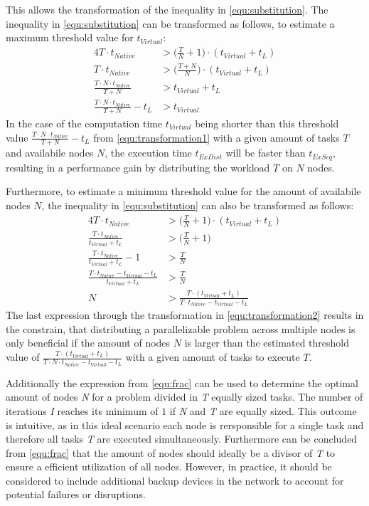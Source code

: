 This allows the transformation of the inequality in \eqref{equ:substitution}. The inequality in \eqref{equ:substitution} can be transformed as follows, to estimate a maximum threshold value for $t_{Virtual}$:
\begin{alignat}{4}
  T \cdot t_{Native} &> \bigg(\frac{T}{N} + 1\bigg) \cdot (t_{Virtual} + t_{L}) \nonumber \\
  T \cdot t_{Native} &> \bigg(\frac{T + N}{N}\bigg) \cdot (t_{Virtual} + t_{L}) \nonumber \\
  \frac{T \cdot N \cdot t_{Native}}{T + N} &> t_{Virtual} + t_{L} \nonumber \\
  \frac{T \cdot N \cdot t_{Native}}{T + N} - t_{L} &> t_{Virtual}
  \label{equ:transformation1}
\end{alignat}
In the case of the computation time $t_{Virtual}$ being shorter than this threshold value $\frac{T \cdot N \cdot t_{Native}}{T + N} - t_{L}$ from \eqref{equ:transformation1} with a given amount of tasks $T$ and availabile nodes $N$, the execution time $t_{ExDist}$ will be faster than $t_{ExSeq}$, resulting in a performance gain by distributing the workload $T$ on $N$ nodes.

Furthermore, to estimate a minimum threshold value for the amount of availabile nodes $N$, the inequality in \eqref{equ:substitution} can also be transformed as follows:
\begin{alignat}{4}
  T \cdot t_{Native} &> \bigg(\frac{T}{N} + 1\bigg) \cdot (t_{Virtual} + t_{L}) \nonumber \\
  \frac{T \cdot t_{Native}}{t_{Virtual} + t_{L}} &> \bigg(\frac{T}{N} + 1\bigg) \nonumber \\
  \frac{T \cdot t_{Native}}{t_{Virtual} + t_{L}} - 1 &> \frac{T}{N} \nonumber \\
  \frac{T \cdot t_{Native} - t_{Virtual} - t_{L}}{t_{Virtual} + t_{L}} &> \frac{T}{N} \nonumber \\
  N &> \frac{T \cdot (t_{Virtual} + t_{L})}{T \cdot t_{Native} - t_{Virtual} - t_{L}}
  \label{equ:transformation2}
\end{alignat}
The last expression through the transformation in \eqref{equ:transformation2} results in the constrain, that distributing a parallelizable problem across multiple nodes is only beneficial if the amount of nodes $N$ is larger than the estimated threshold value of $\frac{T \cdot (t_{Virtual} + t_{L})}{T \cdot N \cdot t_{Native} - t_{Virtual} - t_{L}}$ with a given amount of tasks to execute $T$.

Additionally the expression from \eqref{equ:frac} can be used to determine the optimal amount of nodes \emph{N} for a problem divided in \emph{T} equally sized tasks. The number of iterations \emph{I} reaches its minimum of $1$ if \emph{N} and \emph{T} are equally sized. This outcome is intuitive, as in this ideal scenario each node is rersponsible for a single task and therefore all tasks \emph{T} are executed simultaneously. Furthermore can be concluded from \eqref{equ:frac} that the amount of nodes should ideally be a divisor of \emph{T} to ensure a efficient utilization of all nodes. However, in practice, it should be considered to include additional backup devices in the network to account for potential failures or disruptions.

